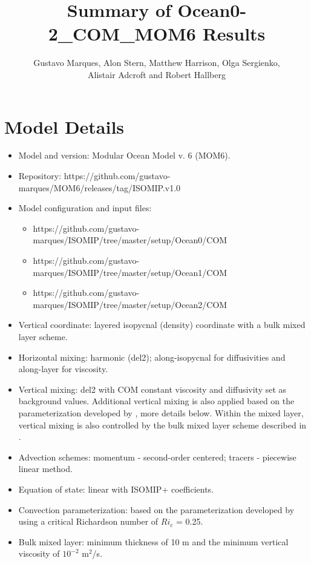 \documentclass[11pt]{article} %
\title{Summary of Ocean0-2\_COM\_MOM6 Results}
\author{Gustavo Marques, Alon Stern, Matthew Harrison, Olga Sergienko, \\ Alistair Adcroft and Robert Hallberg}
\begin{document}
\maketitle

\section{Model Details}

\begin{itemize}
\item Model and version: Modular Ocean Model v. 6 (MOM6).
\item Repository: https://github.com/gustavo-marques/MOM6/releases/tag/ISOMIP.v1.0 
\item Model configuration and input files: 
\begin{itemize}
   \item https://github.com/gustavo-marques/ISOMIP/tree/master/setup/Ocean0/COM
   \item https://github.com/gustavo-marques/ISOMIP/tree/master/setup/Ocean1/COM
   \item https://github.com/gustavo-marques/ISOMIP/tree/master/setup/Ocean2/COM
\end{itemize}

\item Vertical coordinate: layered isopycnal (density) coordinate with a bulk mixed layer scheme.
\item Horizontal mixing: harmonic (del2); along-isopycnal for diffusivities and along-layer for viscosity.
\item Vertical mixing: del2 with COM constant viscosity and diffusivity set as background values. Additional vertical mixing is also applied based on the parameterization developed by \cite{Jackson2008}, more details below. Within the mixed layer, vertical mixing is also controlled by the bulk mixed layer scheme described in \cite{Hallberg2003}.
\item Advection schemes: momentum - second-order centered; tracers - piecewise linear method.
\item Equation of state: linear with ISOMIP+ coefficients.
\item Convection parameterization: based on the parameterization developed by \cite{Jackson2008} using a critical Richardson number of $Ri_c$ = 0.25.

\item Bulk mixed layer: minimum thickness of 10 m and the minimum vertical viscosity of $10^{-2}$ m$^2$/s.


\end{itemize}
\end{document}
